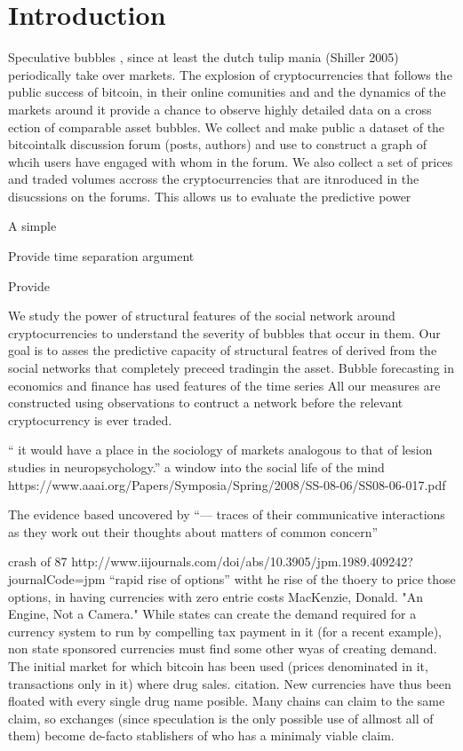 \section{Introduction}

Speculative bubbles , since at least the dutch tulip mania (Shiller 2005) periodically take over markets.
The explosion of cryptocurrencies that follows the public success of bitcoin, in their online comunities and 
and the dynamics of the markets around it provide a chance to observe highly detailed data on a cross ection of comparable asset bubbles.
We collect and make public a dataset of the bitcointalk discussion forum (posts, authors) and use to construct a graph of whcih users have engaged with whom in the forum. 
We also collect a  set of prices and traded volumes accross the cryptocurrencies that are itnroduced in the disucssions on the forums.
This allows us to evaluate the predictive power 

A simple 

Provide time separation argument

Provide 


We study the power of structural features of the social network around cryptocurrencies to understand the severity of bubbles that occur in them. 
Our goal is to asses the predictive capacity of structural featres of derived from the social networks that completely preceed tradingin the asset.
Bubble forecasting in economics and finance has used features of the time series
 All our measures are constructed using observations to contruct a network before the relevant cryptocurrency is ever traded. 



“ it would have a place in the sociology of markets analogous to that of lesion studies in neuropsychology.” a window into the social life of the mind https://www.aaai.org/Papers/Symposia/Spring/2008/SS-08-06/SS08-06-017.pdf

The evidence based uncovered by “— traces of their communicative interactions as they work out their thoughts about matters of common concern” 

crash of 87 http://www.iijournals.com/doi/abs/10.3905/jpm.1989.409242?journalCode=jpm “rapid rise of options” witht he rise of the thoery to price those options, in having currencies with zero entrie costs
MacKenzie, Donald. "An Engine, Not a Camera."
While states can create the demand required for a currency system to run by compelling tax payment in it (for a recent example), non state sponsored currencies must find some other wyas of creating demand.
The initial market for which bitcoin has been used (prices denominated in it, transactions only in it) where drug sales. citation.
New currencies have thus been floated with every single drug name posible. Many chains can claim to the same claim, so exchanges (since speculation is the only possible use of allmost all of them) become de-facto stablishers of who has a minimaly viable claim. 


